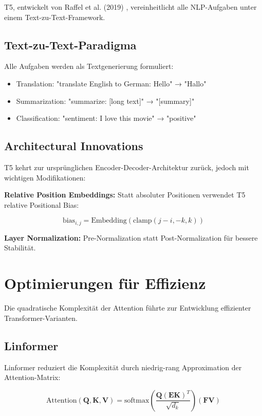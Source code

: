 T5, entwickelt von Raffel et al. (2019) \cite{raffel2019exploring}, vereinheitlicht alle NLP-Aufgaben unter einem Text-zu-Text-Framework.

\subsection{Text-zu-Text-Paradigma}

Alle Aufgaben werden als Textgenerierung formuliert:
\begin{itemize}
    \item Translation: "translate English to German: Hello" → "Hallo"
    \item Summarization: "summarize: [long text]" → "[summary]"
    \item Classification: "sentiment: I love this movie" → "positive"
\end{itemize}

\subsection{Architectural Innovations}

T5 kehrt zur ursprünglichen Encoder-Decoder-Architektur zurück, jedoch mit wichtigen Modifikationen:

\textbf{Relative Position Embeddings:}
Statt absoluter Positionen verwendet T5 relative Positional Bias:

\begin{equation}
\text{bias}_{i,j} = \text{Embedding}(\text{clamp}(j-i, -k, k))
\end{equation}

\textbf{Layer Normalization:}
Pre-Normalization statt Post-Normalization für bessere Stabilität.

\section{Optimierungen für Effizienz}

Die quadratische Komplexität der Attention führte zur Entwicklung effizienter Transformer-Varianten.

\subsection{Linformer}

Linformer reduziert die Komplexität durch niedrig-rang Approximation der Attention-Matrix:

\begin{equation}
\text{Attention}(\mathbf{Q}, \mathbf{K}, \mathbf{V}) = \text{softmax}\left(\frac{\mathbf{Q}(\mathbf{E}\mathbf{K})^T}{\sqrt{d_k}}\right)(\mathbf{F}\mathbf{V})
\end{equation}

